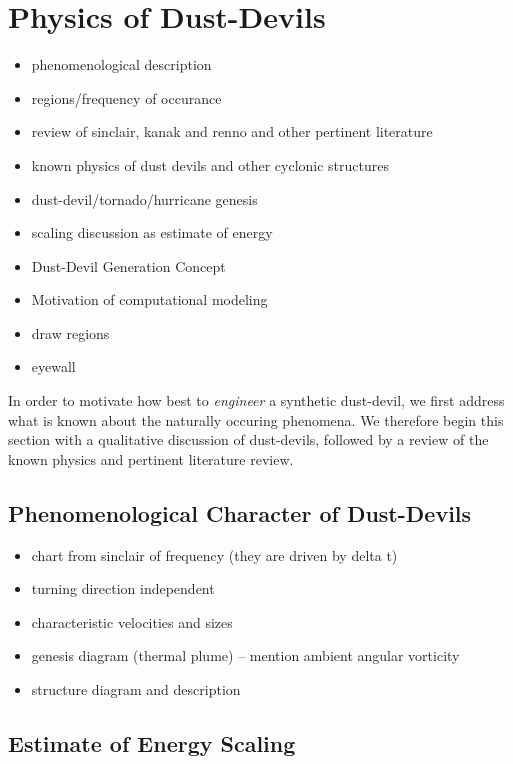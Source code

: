 \section{Physics of Dust-Devils}
\label{sec:physics}
\begin{itemize}
\item phenomenological description
\item regions/frequency of occurance
\item review of sinclair, kanak and renno and other pertinent literature
\item known physics of dust devils and other cyclonic structures
\item dust-devil/tornado/hurricane genesis
\item scaling discussion as estimate of energy
\item Dust-Devil Generation Concept
\item Motivation of computational modeling
\item draw regions
\item eyewall
\end{itemize}

In order to motivate how best to \textit{engineer} a synthetic
dust-devil, we first address what is known about the naturally occuring
phenomena. We therefore begin this section with a qualitative discussion
of dust-devils, followed by a review of the known physics and pertinent 
literature review. 


\subsection{Phenomenological Character of Dust-Devils}
\begin{itemize}
 \item chart from sinclair of frequency (they are driven by delta t)
 \item turning direction independent
 \item characteristic velocities and sizes
 \item genesis diagram (thermal plume) -- mention ambient angular vorticity
 \item structure diagram and description
\end{itemize}


%
%

\subsection{Estimate of Energy Scaling}

